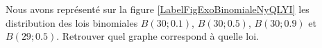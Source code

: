 
\begin{exercice}\label{exosmath-0022}

Nous avons représenté sur la figure \ref{LabelFigExoBinomialeNyQLYI} les distribution des lois binomiales \( B(30;0.1)\), \( B(30;0.5)\), \( B(30;0.9)\) et \( B(29;0.5)\). Retrouver quel graphe correspond à quelle loi.
\newcommand{\CaptionFigExoBinomialeNyQLYI}{Les distributions de quelque binomiales.}


\end{exercice}
